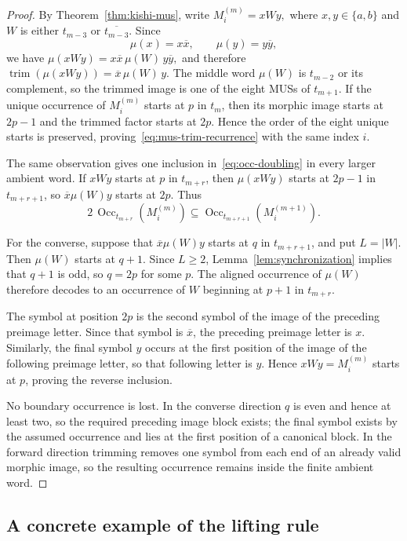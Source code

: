 \documentclass[10pt,a4paper]{article}
\theoremstyle{definition}\newtheorem{definition}[theorem]{Definition}
\theoremstyle{remark}\newtheorem{remark}[theorem]{Remark}
\newcommand{\Occ}{\operatorname{Occ}}
\begin{document}
\begin{proof}
By Theorem~\ref{thm:kishi-mus}, write
$
M_i^{(m)}=xWy,
$
where $x,y\in\{a,b\}$ and $W$ is either $t_{m-3}$ or $\overline{t_{m-3}}$. Since
\[
\mu(x)=x\overline{x},\qquad \mu(y)=y\overline{y},
\]
we have
$
\mu(xWy)=x\overline{x}\,\mu(W)\,y\overline{y},
$
and therefore
$
\operatorname{trim}(\mu(xWy))=\overline{x}\,\mu(W)\,y.
$
The middle word $\mu(W)$ is $t_{m-2}$ or its complement, so the trimmed image is one of the eight MUSs of $t_{m+1}$. If the unique occurrence of $M_i^{(m)}$ starts at $p$ in $t_m$, then its morphic image starts at $2p-1$ and the trimmed factor starts at $2p$. Hence the order of the eight unique starts is preserved, proving~\eqref{eq:mus-trim-recurrence} with the same index $i$.

The same observation gives one inclusion in~\eqref{eq:occ-doubling} in every larger ambient word. If $xWy$ starts at $p$ in $t_{m+r}$, then $\mu(xWy)$ starts at $2p-1$ in $t_{m+r+1}$, so $\overline{x}\mu(W)y$ starts at $2p$. Thus
\[
2\,\Occ_{t_{m+r}}(M_i^{(m)})
\subseteq
\Occ_{t_{m+r+1}}(M_i^{(m+1)}).
\]

For the converse, suppose that $\overline{x}\mu(W)y$ starts at $q$ in $t_{m+r+1}$, and put $L=|W|$. Then $\mu(W)$ starts at $q+1$. Since $L\ge2$, Lemma~\ref{lem:synchronization} implies that $q+1$ is odd, so $q=2p$ for some $p$. The aligned occurrence of $\mu(W)$ therefore decodes to an occurrence of $W$ beginning at $p+1$ in $t_{m+r}$.

The symbol at position $2p$ is the second symbol of the image of the preceding preimage letter. Since that symbol is $\overline{x}$, the preceding preimage letter is $x$. Similarly, the final symbol $y$ occurs at the first position of the image of the following preimage letter, so that following letter is $y$. Hence $xWy=M_i^{(m)}$ starts at $p$, proving the reverse inclusion.

No boundary occurrence is lost. In the converse direction $q$ is even and hence at least two, so the required preceding image block exists; the final symbol exists by the assumed occurrence and lies at the first position of a canonical block. In the forward direction trimming removes one symbol from each end of an already valid morphic image, so the resulting occurrence remains inside the finite ambient word.
\end{proof}

\subsection{A concrete example of the lifting rule}
\label{subsec:lifting-example}
\end{document}
